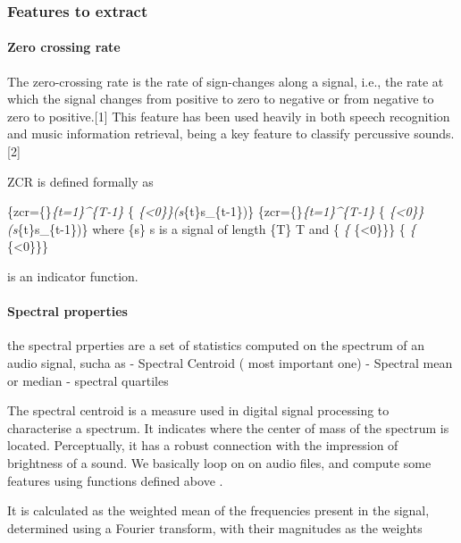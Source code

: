 \documentclass[]{article}
\let\oldparagraph\paragraph
\renewcommand{\paragraph}[1]{\oldparagraph{#1}\mbox{}}
\begin{document}
\subsubsection{Features to extract}\label{features-to-extract}

\paragraph{Zero crossing rate}\label{zero-crossing-rate}

The zero-crossing rate is the rate of sign-changes along a signal, i.e.,
the rate at which the signal changes from positive to zero to negative
or from negative to zero to positive.{[}1{]} This feature has been used
heavily in both speech recognition and music information retrieval,
being a key feature to classify percussive sounds.{[}2{]}

ZCR is defined formally as

\{\displaystyle zcr=\{\}\sum \emph{\{t=1\}\^{}\{T-1\}
}\{ \emph{\{\textless{}0\}\}(s}\{t\}s\_\{t-1\})\}
\{\displaystyle zcr=\{\}\sum \emph{\{t=1\}\^{}\{T-1\}
}\{ \emph{\{\textless{}0\}\}(s}\{t\}s\_\{t-1\})\} where
\{\displaystyle s\} s is a signal of length \{\displaystyle T\} T and
\{\displaystyle {} \emph{\{ }\{\textless{}0\}\}\}
\{\displaystyle {} \emph{\{ }\{\textless{}0\}\}\}

is an indicator function.

\paragraph{Spectral properties}\label{spectral-properties}

the spectral prperties are a set of statistics computed on the spectrum
of an audio signal, sucha as - Spectral Centroid ( most important one) -
Spectral mean or median - spectral quartiles

The spectral centroid is a measure used in digital signal processing to
characterise a spectrum. It indicates where the center of mass of the
spectrum is located. Perceptually, it has a robust connection with the
impression of brightness of a sound. We basically loop on on audio
files, and compute some features using functions defined above .

It is calculated as the weighted mean of the frequencies present in the
signal, determined using a Fourier transform, with their magnitudes as
the weights
\end{document}
